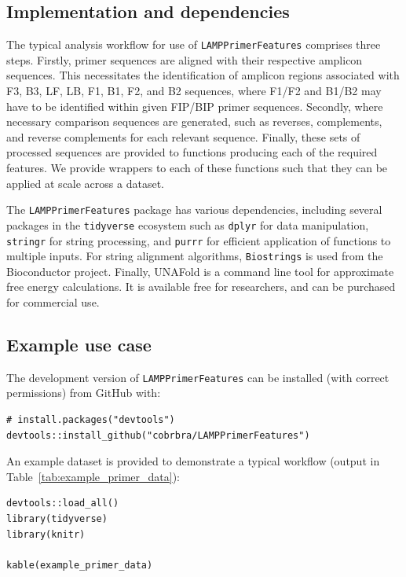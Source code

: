 \documentclass[../thesis.tex]{subfiles}
\begin{document}
\subsection{Implementation and dependencies}

The typical analysis workflow for use of \texttt{LAMPPrimerFeatures} comprises three steps. Firstly, primer sequences are aligned with their respective amplicon sequences. This necessitates the identification of amplicon regions associated with F3, B3, LF, LB, F1, B1, F2, and B2 sequences, where F1/F2 and B1/B2 may have to be identified within given FIP/BIP primer sequences. Secondly, where necessary comparison sequences are generated, such as reverses, complements, and reverse complements for each relevant sequence. Finally, these sets of processed sequences are provided to functions producing each of the required features. We provide wrappers to each of these functions such that they can be applied at scale across a dataset.

The \texttt{LAMPPrimerFeatures} package has various dependencies, including several packages in the \texttt{tidyverse} ecosystem such as \texttt{dplyr} for data manipulation, \texttt{stringr} for string processing, and \texttt{purrr} for efficient application of functions to multiple inputs. For string alignment algorithms, \texttt{Biostrings} is used from the Bioconductor project. Finally, UNAFold \citep{markham_unafold_2008} is a command line tool for approximate free energy calculations. It is available free for researchers, and can be purchased for commercial use.

\subsection{Example use case}

The development version of \texttt{LAMPPrimerFeatures} can be installed (with correct permissions) from
GitHub with:
\begin{lstlisting}
# install.packages("devtools")
devtools::install_github("cobrbra/LAMPPrimerFeatures")
\end{lstlisting}

An example dataset is provided to
demonstrate a typical workflow (output in Table~\ref{tab:example_primer_data}):

\begin{lstlisting}
devtools::load_all()
library(tidyverse)
library(knitr)

kable(example_primer_data)
\end{lstlisting}
\end{document}
